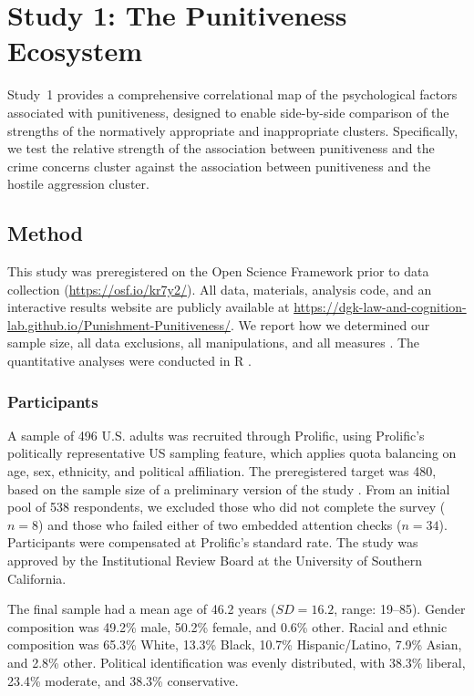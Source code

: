\section{Study 1: The Punitiveness Ecosystem}

Study~1 provides a comprehensive correlational map of the psychological factors associated with punitiveness, designed to enable side-by-side comparison of the strengths of the normatively appropriate and inappropriate clusters. Specifically, we test the relative strength of the association between punitiveness and the crime concerns cluster against the association between punitiveness and the hostile aggression cluster.

\subsection{Method}

This study was preregistered on the Open Science Framework prior to data collection (\url{https://osf.io/kr7y2/}). All data, materials, analysis code, and an interactive results website are publicly available at \url{https://dgk-law-and-cognition-lab.github.io/Punishment-Punitiveness/}. We report how we determined our sample size, all data exclusions, all manipulations, and all measures \citep{simmons2012false}. The quantitative analyses were conducted in R \citep{Rcore2024}.

\subsubsection{Participants}

A sample of 496 U.S. adults was recruited through Prolific, using Prolific's politically representative US sampling feature, which applies quota balancing on age, sex, ethnicity, and political affiliation. The preregistered target was 480, based on the sample size of a preliminary version of the study \citep{SimonMelnikoff2025}. From an initial pool of 538 respondents, we excluded those who did not complete the survey ($n = 8$) and those who failed either of two embedded attention checks ($n = 34$). Participants were compensated at Prolific's standard rate. The study was approved by the Institutional Review Board at the University of Southern California.

The final sample had a mean age of 46.2 years ($SD = 16.2$, range: 19--85). Gender composition was 49.2\% male, 50.2\% female, and 0.6\% other. Racial and ethnic composition was 65.3\% White, 13.3\% Black, 10.7\% Hispanic/Latino, 7.9\% Asian, and 2.8\% other. Political identification was evenly distributed, with 38.3\% liberal, 23.4\% moderate, and 38.3\% conservative.

